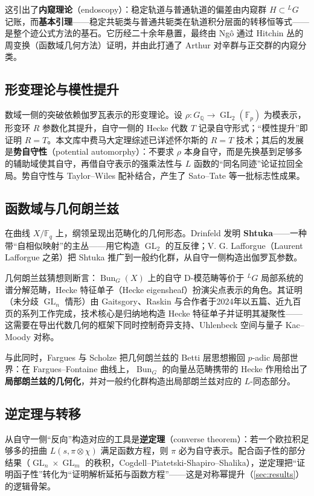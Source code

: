 这引出了\textbf{内窥理论}（endoscopy）：稳定轨道与普通轨道的偏差由内窥群 $H \subset {}^LG$ 记账，而\textbf{基本引理}——稳定共轭类与普通共轭类在轨道积分层面的转移恒等式——是整个迹公式方法的基石。它历经二十余年悬置，最终由 Ng\^o 通过 Hitchin 丛的周变换（函数域几何方法）证明\cite{ngo2010}，并由此打通了 Arthur 对辛群与正交群的内窥分类\cite{arthur2013}。

\subsection{形变理论与模性提升}

数域一侧的突破依赖伽罗瓦表示的形变理论。设 $\rho: G_{\mathbb{Q}} \to \operatorname{GL}_2(\mathbb{F}_p)$ 为模表示，形变环 $R$ 参数化其提升，自守一侧的 Hecke 代数 $T$ 记录自守形式；“模性提升”即证明 $R = T$。本文库中费马大定理综述已详述怀尔斯的 $R=T$ 技术\cite{wiles1995modular,taylor1995ring}；其后的发展是\textbf{势自守性}（potential automorphy）\cite{blggt2014}：不要求 $\rho$ 本身自守，而是先换基到足够多的辅助域使其自守，再借自守表示的强乘法性与 $L$ 函数的“同名同迹”论证拉回全局。势自守性与 Taylor--Wiles 配补结合，产生了 Sato--Tate 等一批标志性成果。

\subsection{函数域与几何朗兰兹}

在曲线 $X/\mathbb{F}_q$ 上，纲领呈现出范畴化的几何形态。Drinfeld 发明 \textbf{Shtuka}——一种带“自相似映射”的主丛——用它构造 $\operatorname{GL}_2$ 的互反律；V. G. Lafforgue（Laurent Lafforgue 之弟）把 Shtuka 推广到一般约化群，从自守一侧构造出伽罗瓦参数\cite{vlafforgue2018}。

几何朗兰兹猜想则断言：$\operatorname{Bun}_G(X)$ 上的自守 D-模范畴等价于 $^LG$ 局部系统的谱分解范畴，Hecke 特征单子（Hecke eigensheaf）扮演尖点表示的角色。其证明（未分歧 $\operatorname{GL}_n$ 情形）由 Gaitsgory、Raskin 与合作者于2024年以五篇、近九百页的系列工作完成\cite{gaitsgoryraskin2024}，技术核心是归纳地构造 Hecke 特征单子并证明其凝聚性——这需要在导出代数几何的框架下同时控制奇异支持、Uhlenbeck 空间与量子 Kac--Moody 对称。

与此同时，Fargues 与 Scholze 把几何朗兰兹的 Betti 层思想搬回 $p$-adic 局部世界：在 Fargues--Fontaine 曲线上，$\operatorname{Bun}_G$ 的向量丛范畴携带的 Hecke 作用给出了\textbf{局部朗兰兹的几何化}，并对一般约化群构造出局部朗兰兹对应的 $L$-同态部分\cite{fargues2021}。

\subsection{逆定理与转移}

从自守一侧“反向”构造对应的工具是\textbf{逆定理}（converse theorem）：若一个欧拉积足够多的扭曲 $L(s, \pi \otimes \chi)$ 满足函数方程，则 $\pi$ 必为自守表示。配合函子性的部分结果（$\operatorname{GL}_n \times \operatorname{GL}_m$ 的秩积，Cogdell--Piatetski-Shapiro--Shalika），逆定理把“证明函子性”转化为“证明解析延拓与函数方程”——这是对称幂提升（\cref{sec:results}）的逻辑骨架。
